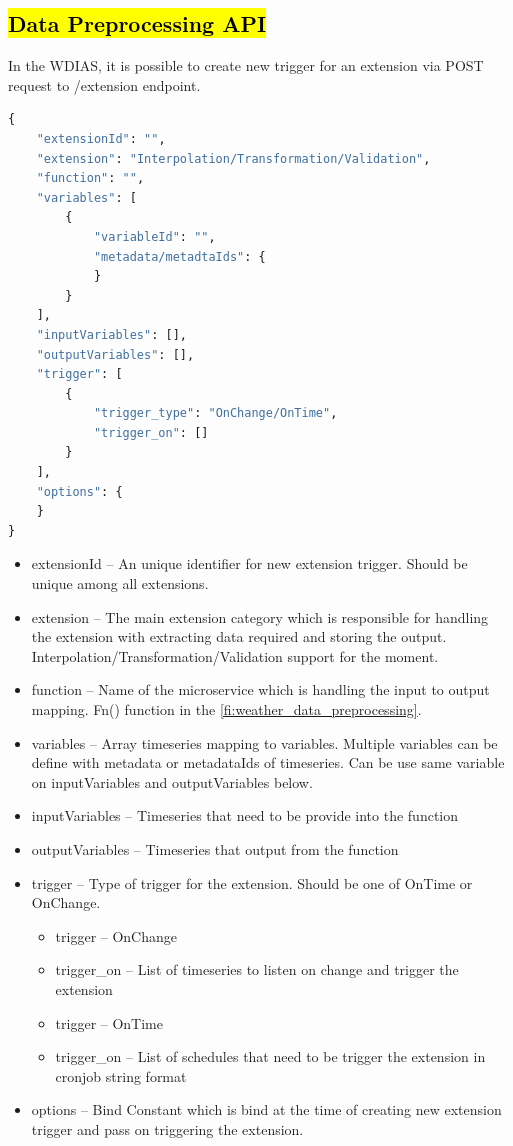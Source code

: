 \subsection{\hl{Data Preprocessing API}}
In the WDIAS, it is possible to create new trigger for an extension via POST request to /extension endpoint.
\begin{lstlisting}[language=Python]
{
    "extensionId": "",
    "extension": "Interpolation/Transformation/Validation",
    "function": "",
    "variables": [
        {
            "variableId": "",
            "metadata/metadtaIds": {
            }
        }
    ],
    "inputVariables": [],
    "outputVariables": [],
    "trigger": [
        {
            "trigger_type": "OnChange/OnTime",
            "trigger_on": []
        }
    ],
    "options": {
    }
}
\end{lstlisting}
\begin{itemize}
    \item extensionId -- An unique identifier for new extension trigger. Should be unique among all extensions.
    \item extension -- The main extension category which is responsible for handling the extension with extracting data required and storing the output. Interpolation/Transformation/Validation support for the moment.
    \item function -- Name of the microservice which is handling the input to output mapping. Fn() function in the \cref{fi:weather_data_preprocessing}.
    \item variables -- Array timeseries mapping to variables. Multiple variables can be define with metadata or metadataIds of timeseries. Can be use same variable on inputVariables and outputVariables below.
    \item inputVariables -- Timeseries that need to be provide into the function
    \item outputVariables -- Timeseries that output from the function
    \item trigger -- Type of trigger for the extension. Should be one of OnTime or OnChange.
    \begin{itemize}
        \item trigger -- OnChange
        \item trigger\_on -- List of timeseries to listen on change and trigger the extension
    \end{itemize}
    \begin{itemize}
        \item trigger -- OnTime
        \item trigger\_on -- List of schedules that need to be trigger the extension in cronjob string format
    \end{itemize}
    \item options -- Bind Constant which is bind at the time of creating new extension trigger and pass on triggering the extension.
\end{itemize}

